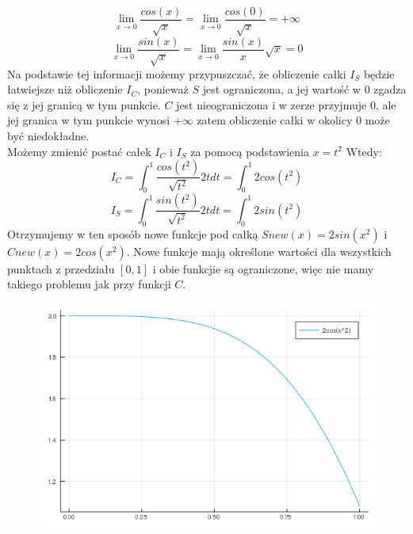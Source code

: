 \documentclass{article}
\begin{document}
\begin{equation}
\lim_{x\to 0}  \frac{cos(x)}{\sqrt{x}} = \lim_{x\to 0} \frac{cos(0)}{\sqrt{x}} = +\infty
\end{equation}
\begin{equation}
\lim_{x\to 0}  \frac{sin(x)}{\sqrt{x}} = \lim_{x\to 0}  \frac{sin(x)}{x} \sqrt{x} = 0
\end{equation}
Na podstawie tej informacji możemy przypuszczać, że obliczenie całki $I_S$ będzie łatwiejsze niż obliczenie $I_C$, ponieważ $S$ jest ograniczona, a jej wartość w $0$ zgadza się z jej granicą w tym punkcie. $C$ jest nieograniczona i w zerze przyjmuje $0$, ale jej granica w tym punkcie wynosi $+\infty$ zatem obliczenie całki w okolicy $0$ może być niedokładne.\\
Możemy zmienić postać całek $I_C$ i $I_S$ za pomocą podstawienia $x=t^2$ Wtedy:
\begin{equation}
I_C = \int_0^1 \frac{cos(t^2)}{\sqrt{t^2}} 2tdt = \int_0^1 2cos(t^2)
\end{equation}
\begin{equation}
I_S = \int_0^1 \frac{sin(t^2)}{\sqrt{t^2}} 2tdt = \int_0^1 2sin(t^2)
\end{equation}
Otrzymujemy w ten sposób nowe funkcje pod całką $Snew(x) = 2sin(x^2)$ i $Cnew(x) = 2cos(x^2)$. Nowe funkcje mają określone wartości dla wszystkich punktach z przedziału $[0,1]$ i obie funkcjie są ograniczone, więc nie mamy takiego problemu jak przy funkcji $C$.
\begin{figure}[ht]
    \includegraphics[scale=0.5]{WykresCnew.png}
    \label{wykresCnew}
\end{figure}
\end{document}
